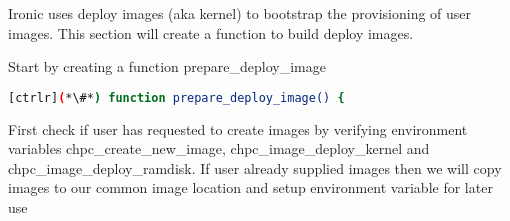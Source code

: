 Ironic uses deploy images (aka kernel) to bootstrap the provisioning of user images.  This section will create a function to build deploy images. 

Start by creating a function prepare\_deploy\_image

\begin{lstlisting}[language=bash,keywords={}]
[ctrlr](*\#*) function prepare_deploy_image() {
\end{lstlisting}

First check if user has requested to create images by verifying environment variables chpc\_create\_new\_image, chpc\_image\_deploy\_kernel and chpc\_image\_deploy\_ramdisk. If user already supplied images then we will copy images to our common image location and setup environment variable for later use

